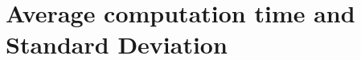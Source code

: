 \newpage\cleardoublepage{}
\section{Average computation time and Standard Deviation}
\label{app:report}